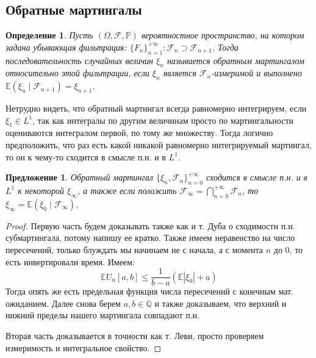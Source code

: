 \documentclass[12pt,a4paper]{article} %
\newtheorem{definition}{Определение}
\newtheorem{proposition}{Предложение}
\newcommand{\E}{\mathbb{E}}
\newcommand{\PR}{\mathbb{P}}
\newcommand{\F}{\mathcal{F}}
\begin{document}
	\subsection{Обратные мартингалы}
	\begin{definition}
		Пусть $(\Omega,\F,\PR)$ вероятностное пространство, на котором задана убывающая фильтрация: $\{F_n\}_{n=1}^{+\infty}:\F_n\supset\F_{n+1}$. Тогда последовательность случайных величин $\xi_n$ называется обратным мартингалом относительно этой фильтрации, если $\xi_n$ является $\F_n$-измеримой и выполнено $\E(\xi_n\mid\F_{n+1})=\xi_{n+1}$.
	\end{definition}
	Нетрудно видеть, что обратный мартингал всегда равномерно интегрируем, если $\xi_1\in L^1$, так как интегралы по другим величинам просто по мартингальности оцениваются интегралом первой, по тому же множеству. Тогда логично предположить, что раз есть какой никакой равномерно интегрируемый мартингал, то он к чему-то сходится в смысле п.н. и в $L^1$.
	\begin{proposition}
		Обратный мартингал $\{\xi_n,\F_n\}_{n=0}^{+\infty}$ сходится в смысле п.н. и в $L^1$ к некоторой $\xi_{\infty}$, а также если положить $\F_{\infty}=\displaystyle\bigcap_{n=0}^{+\infty}\F_n$, то $\xi_{\infty}=\E(\xi_0\mid\F_{\infty})$.
	\end{proposition}
	\begin{proof}
		Первую часть будем доказывать также как и т. Дуба о сходимости п.н. субмартингала, потому напишу ее кратко. Также имеем неравенство на число пересечений, только блуждать мы начинаем не с начала, а с момента $n$ до 0, то есть инвертировали время. Имеем:
		$$\E U_n[a,b]\leq\frac{1}{b-a}(\E|\xi_0|+a)$$
		Тогда опять же есть предельная функция числа пересечений с конечным мат. ожиданием. Далее снова берем $a,b\in\mathbb{Q}$ и также доказываем, что верхний и нижний пределы нашего мартингала совпадают п.н.
		
		Вторая часть доказывается в точности как т. Леви, просто проверяем измеримость и интегральное свойство.
	\end{proof}
\end{document}
